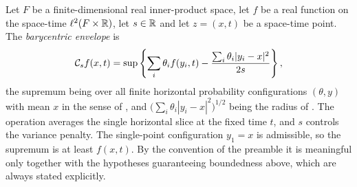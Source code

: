 \begin{definition}
Let $F$ be a finite-dimensional real inner-product space, let $f$ be a real
function on the space-time $\ell^2(F\times\mathbb{R})$, let $s\in\mathbb{R}$ and let $z=(x,t)$
be a space-time point. The \emph{barycentric envelope} is
\[
  \mathcal{C}_s f(x,t)=
  \sup\left\{\sum_i\theta_i f(y_i,t)
             -\frac{\sum_i\theta_i|y_i-x|^2}{2s}\right\},
\]
the supremum being over all finite horizontal probability configurations
$(\theta,y)$ with mean $x$ in the sense of , and
$\bigl(\sum_i\theta_i|y_i-x|^2\bigr)^{1/2}$ being the radius of
. The operation averages the single horizontal slice at the
fixed time $t$, and $s$ controls the variance penalty. The single-point
configuration $y_1=x$ is admissible, so the supremum is at least $f(x,t)$. By
the convention of the preamble it is meaningful only together with the
hypotheses guaranteeing boundedness above, which are always stated explicitly.
\end{definition}

